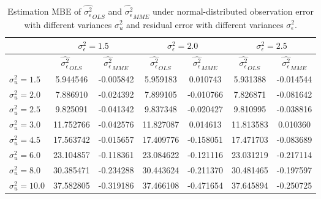 \documentclass{article}
\begin{document}
\begin{table}[ht]
    \centering
    \caption{Estimation MBE of $\hat{\sigma^2_\epsilon}_{OLS}$ and $\hat{\sigma^2_\epsilon}_{MME}$ under normal-distributed observation error with different variances $\sigma^2_u$ and residual error with different variances $\sigma^2_\epsilon$.}
    \label{Tab:MBE_sigma_normal}
    \begin{tabular}[t]{lcccccc}
        \hline
        &\multicolumn{2}{c}{$\sigma^2_\epsilon=1.5$}&\multicolumn{2}{c}{$\sigma^2_\epsilon=2.0$}&\multicolumn{2}{c}{$\sigma^2_\epsilon=2.5$}\\
        \hline
        &$\hat{\sigma^2_\epsilon}_{OLS}$&$\hat{\sigma^2_\epsilon}_{MME}$&$\hat{\sigma^2_\epsilon}_{OLS}$&
        $\hat{\sigma^2_\epsilon}_{MME}$&$\hat{\sigma^2_\epsilon}_{OLS}$&$\hat{\sigma^2_\epsilon}_{MME}$\\
        \hline
        $\sigma^2_u = 1.5$&5.944546&-0.005842&5.959183&0.010743&5.931388&-0.014544\\
        $\sigma^2_u = 2.0$&7.886910&-0.024392&7.899105&-0.010766&7.826871&-0.081642\\
        $\sigma^2_u = 2.5$&9.825091&-0.041342&9.837348&-0.020427&9.810995&-0.038816\\
        $\sigma^2_u = 3.0$&11.752766&-0.042576&11.827087&0.014613&11.813583&0.010360\\
        $\sigma^2_u = 4.5$&17.563742&-0.015657&17.409776&-0.158051&17.471703&-0.083689\\
        $\sigma^2_u = 6.0$&23.104857&-0.118361&23.084622&-0.121116&23.031219&-0.217114\\
        $\sigma^2_u = 8.0$&30.385471&-0.234288&30.443624&-0.211370&30.481465&-0.197597\\
        $\sigma^2_u = 10.0$&37.582805&-0.319186&37.466108&-0.471654&37.645894&-0.250725\\
        \hline
    \end{tabular}
\end{table}
\end{document}

